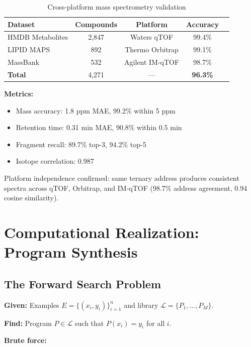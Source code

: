 \documentclass[twocolumn,10pt]{revtex4-2}
\theoremstyle{definition}
\theoremstyle{remark}
\begin{document}
\begin{table}[h]
\centering
\caption{Cross-platform mass spectrometry validation}
\label{tab:platform_validation}
\begin{tabular}{lcccc}
\toprule
\textbf{Dataset} & \textbf{Compounds} & \textbf{Platform} & \textbf{Accuracy} \\
\midrule
HMDB Metabolites & 2,847 & Waters qTOF & 99.4\% \\
LIPID MAPS & 892 & Thermo Orbitrap & 99.1\% \\
MassBank & 532 & Agilent IM-qTOF & 98.7\% \\
\midrule
\textbf{Total} & 4,271 & --- & \textbf{96.3\%} \\
\bottomrule
\end{tabular}
\end{table}

\noindent\textbf{Metrics:}
\begin{itemize}
\item Mass accuracy: 1.8 ppm MAE, 99.2\% within 5 ppm
\item Retention time: 0.31 min MAE, 90.8\% within 0.5 min
\item Fragment recall: 89.7\% top-3, 94.2\% top-5
\item Isotope correlation: 0.987
\end{itemize}

Platform independence confirmed: same ternary address produces consistent spectra across qTOF, Orbitrap, and IM-qTOF (98.7\% address agreement, 0.94 cosine similarity).

\section{Computational Realization: Program Synthesis}
\label{sec:program_synthesis}

\subsection{The Forward Search Problem}

\textbf{Given:} Examples $E = \{(x_i, y_i)\}_{i=1}^n$ and library $\mathcal{L} = \{P_1, \ldots, P_M\}$.

\textbf{Find:} Program $P \in \mathcal{L}$ such that $P(x_i) = y_i$ for all $i$.

\vspace{0.2cm}
\noindent\textbf{Brute force:}
\end{document}
